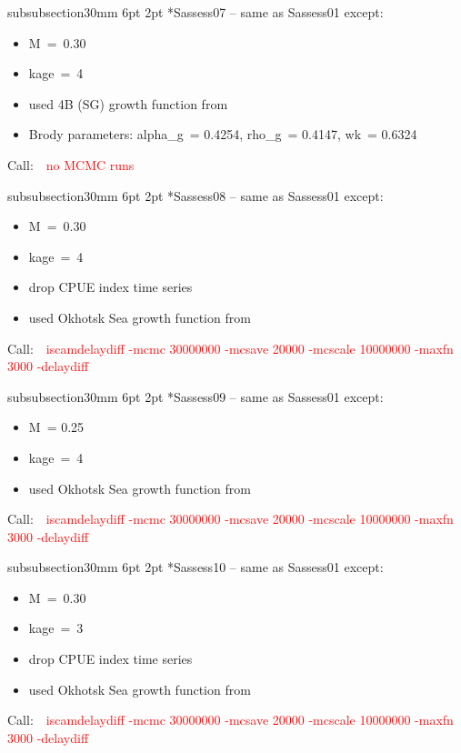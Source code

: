 \documentclass[11pt]{book}
\makeatletter
\newcommand{\red}[1]{{\textcolor{red} {#1}}}
\renewcommand{\subsubsection}{\@startsection%
{subsubsection}{3}{0mm}%
{6pt \@plus -0pt \@minus -0pt}{2pt \@plus 0pt}%
{\normalfont\bf}}%
\newcommand\call[1]{
\footnotesize\selectfont\hangindent=0.35in
Call:~~\red{#1}
\normalsize\selectfont}
\makeatother
\begin{document}
\subsubsection*{Sassess07 -- same as Sassess01 except:}
\begin{itemize}[nosep]
  \item M~=~0.30
  \item kage~=~4
  \item used 4B (SG) growth function from \citet{Saunders-etal:1989}
  \item Brody parameters: alpha\_g~= 0.4254, rho\_g~= 0.4147, wk~= 0.6324
\end{itemize}
\call{no MCMC runs}

\subsubsection*{Sassess08 -- same as Sassess01 except:}
\begin{itemize}[nosep]
  \item M~=~0.30
  \item kage~=~4
  \item drop CPUE index time series
  \item used Okhotsk Sea growth function from \citet{Janusz-Horbowy:1997}
\end{itemize}
\call{iscamdelaydiff -mcmc 30000000 -mcsave 20000 -mcscale 10000000 -maxfn 3000 -delaydiff}

\subsubsection*{Sassess09 -- same as Sassess01 except:}
\begin{itemize}[nosep]
  \item M~= 0.25
  \item kage~=~4
  \item used Okhotsk Sea growth function from \citet{Janusz-Horbowy:1997}
\end{itemize}
\call{iscamdelaydiff -mcmc 30000000 -mcsave 20000 -mcscale 10000000 -maxfn 3000 -delaydiff}

\subsubsection*{Sassess10 -- same as Sassess01 except:}
\begin{itemize}[nosep]
  \item M~=~0.30
  \item kage~=~3
  \item drop CPUE index time series
  \item used Okhotsk Sea growth function from \citet{Janusz-Horbowy:1997}
\end{itemize}
\call{iscamdelaydiff -mcmc 30000000 -mcsave 20000 -mcscale 10000000 -maxfn 3000 -delaydiff}
\end{document}
